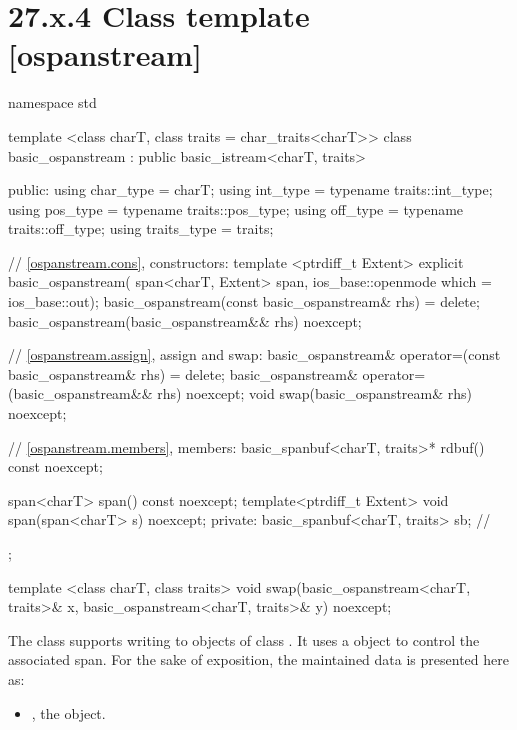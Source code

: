 \documentclass[ebook,11pt,article]{memoir}
\begin{document}
\section{27.x.4 Class template  [ospanstream] }

\begin{codeblock}
namespace std {
  template <class charT, class traits = char_traits<charT>>
  class basic_ospanstream
    : public basic_istream<charT, traits> {
  public:
    using char_type      = charT;
    using int_type       = typename traits::int_type;
    using pos_type       = typename traits::pos_type;
    using off_type       = typename traits::off_type;
    using traits_type    = traits;

    // \ref{ospanstream.cons}, constructors:
    template <ptrdiff_t Extent>
    explicit basic_ospanstream(
      span<charT, Extent> span,
      ios_base::openmode which = ios_base::out);
    basic_ospanstream(const basic_ospanstream& rhs) = delete;
    basic_ospanstream(basic_ospanstream&& rhs) noexcept;

    // \ref{ospanstream.assign}, assign and swap:
    basic_ospanstream& operator=(const basic_ospanstream& rhs) = delete;
    basic_ospanstream& operator=(basic_ospanstream&& rhs) noexcept;
    void swap(basic_ospanstream& rhs) noexcept;

    // \ref{ospanstream.members}, members:
    basic_spanbuf<charT, traits>* rdbuf() const noexcept;

    span<charT> span() const noexcept;
	template<ptrdiff_t Extent>
    void span(span<charT> s) noexcept;
  private:
    basic_spanbuf<charT, traits> sb; // \expos
  };

  template <class charT, class traits>
    void swap(basic_ospanstream<charT, traits>& x,
              basic_ospanstream<charT, traits>& y) noexcept;
}
\end{codeblock}

\pnum
The class
supports writing to objects of class
.
It uses a
object to control the associated span.
For the sake of exposition, the maintained data is presented here as:
\begin{itemize}
\item
{}, the  object.
\end{itemize}

\end{document}
